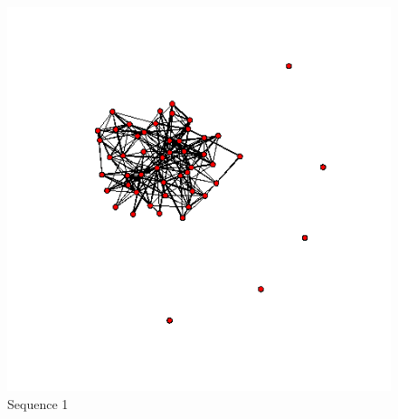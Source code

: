 \documentclass[a4paper, 11pt]{report}
\theoremstyle{definition}
\begin{document}
\begin{figure}[h]
\begin{center}
    \includegraphics[scale=0.26]{pictures/f1_19_nework.png}
    \caption{Sequence 1}
    \end{center}
\end{figure}
\end{document}
